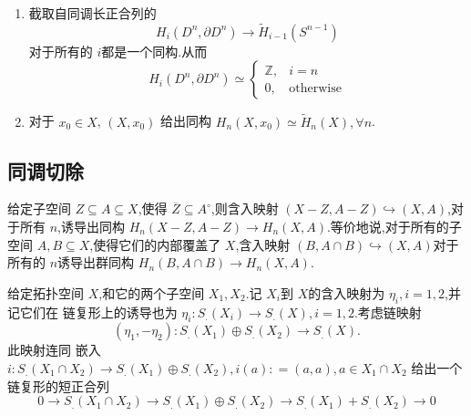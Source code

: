 \documentclass[../../几何与拓扑.tex]{subfiles}
\begin{document}
\begin{example}
    \begin{enumerate}
        \item 截取自同调长正合列的 \[
        H_{i}\left( D^{n}, \partial D^{n} \right)\to \tilde{H}_{i-1}\left( S^{n-1} \right)  
        \]对于所有的 \(  i  \)都是一个同构.从而 \[
        H_{i}\left( D^{n}, \partial D^{n} \right)\simeq \begin{cases} \mathbb{Z} ,&i= n\\ 
         0,& \text{otherwise} \end{cases}  
        \]
        \item 对于 \(  x_0 \in X  \), \(  \left( X,x_0 \right)   \)  给出同构 \(  H_{n}\left( X,x_0 \right)\simeq \tilde{H}_{n}\left( X \right) ,\forall n    \). 
    \end{enumerate}
    
\end{example}

\hspace*{\fill} 


\subsection{同调切除}

\begin{theorem}
    给定子空间 \(  Z\subseteq A\subseteq X  \),使得 \(  \overline{Z}\subseteq A^{\circ}  \),则含入映射  \(  \left( X-Z,A-Z \right)\hookrightarrow \left( X,A \right)    \),对于所有 \(  n  \),诱导出同构 \(  H_{n}\left( X-Z,A-Z \right)\to H_{n}\left( X,A \right)    \).等价地说,对于所有的子空间 \(  A,B\subseteq X   \),使得它们的内部覆盖了 \(  X  \),含入映射 \(  \left( B,A\cap B \right)\hookrightarrow \left( X,A \right)    \)对于所有的 \(  n  \)诱导出群同构 \(  H_{n}\left( B, A\cap B \right)\to H_{n}\left( X,A \right)    \).      
\end{theorem}

\begin{lemma}
    给定拓扑空间 \(  X  \),和它的两个子空间 \(  X_1,X_2  \).记 \(  X_{i}  \)到 \(  X  \)的含入映射为 \(  \eta _i , i= 1,2  \),并记它们在
    链复形上的诱导也为 \(  \eta _i : S_{.} \left( X _{i} \right)\to S_{.}\left( X \right)     , i= 1,2\).考虑链映射 \[
    \left( \eta _1 ,-\eta _2  \right): S_{.}\left( X_1 \right) \oplus S_{.}\left( X_2 \right)\to S_{.}\left( X \right).    
    \]      此映射连同 嵌入 \(  i:S_{.}\left( X_1\cap X_2 \right)\to  S_{.}\left( X_1 \right)\oplus S_{.}\left( X_2 \right), i\left( a \right): =  \left( a,a \right),a \in X_1\cap X_2       \) 给出一个链复形的短正合列
    \[
        0\to S_.(X_1\cap X_2)\to S_.(X_1)\oplus S_.(X_2)\to S_.(X_1)+S_.(X_2)\to0
    \]
\end{lemma}
\end{document}
